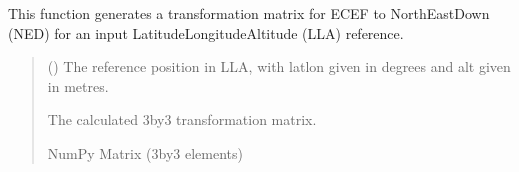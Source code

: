 \documentclass[letterpaper,10pt,english]{sphinxmanual}
\begin{document}
\begin{fulllineitems}
\label{\detokenize{modules/util/transformations:qnav.util.transformations.ecef2ned_transform}}
\pysigstartsignatures
{}
\pysigstopsignatures
\sphinxAtStartPar
This function generates a transformation matrix for ECEF to
North\sphinxhyphen{}East\sphinxhyphen{}Down (NED) for an input Latitude\sphinxhyphen{}Longitude\sphinxhyphen{}Altitude (LLA)
reference.
\begin{quote}\begin{description}
\sphinxAtStartPar
{} (\sphinxstyleliteralemphasis{\sphinxupquote{ (}}\sphinxstyleliteralemphasis{\sphinxupquote{)}}) \textendash{} The reference position in LLA, with lat\sphinxhyphen{}lon given in
degrees and alt given in metres.

\sphinxAtStartPar
The calculated 3\sphinxhyphen{}by\sphinxhyphen{}3 transformation matrix.

\sphinxAtStartPar
NumPy Matrix (3\sphinxhyphen{}by\sphinxhyphen{}3 elements)

\end{description}\end{quote}

\end{fulllineitems}

\end{document}
